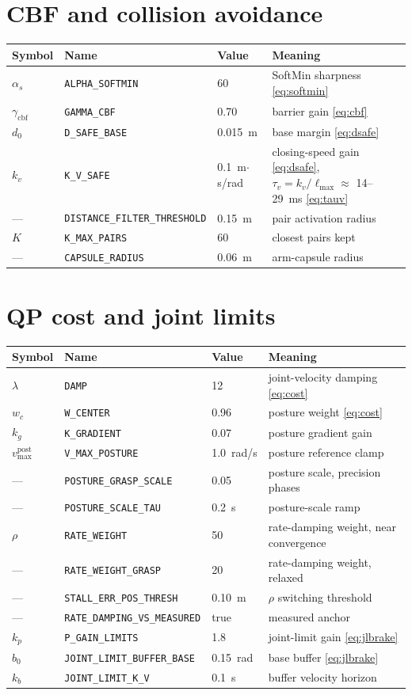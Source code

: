 \documentclass[12pt,a4paper,twoside,openright]{report}
\begin{document}
\section{CBF and collision avoidance}
\begin{tabularx}{\linewidth}{@{}lllX@{}}
\toprule
Symbol & Name & Value & Meaning \\
\midrule
$\alpha_s$ & \texttt{ALPHA\_SOFTMIN} & 60 & SoftMin sharpness \eqref{eq:softmin} \\
$\gamma_{\text{cbf}}$ & \texttt{GAMMA\_CBF} & 0.70 & barrier gain \eqref{eq:cbf} \\
$d_0$ & \texttt{D\_SAFE\_BASE} & 0.015~m & base margin \eqref{eq:dsafe} \\
$k_v$ & \texttt{K\_V\_SAFE} & 0.1~m$\cdot$s/rad & closing-speed gain \eqref{eq:dsafe}, $\tau_v = k_v/\ell_{\max} \approx$ 14--29~ms \eqref{eq:tauv} \\
--- & \texttt{DISTANCE\_FILTER\_THRESHOLD} & 0.15~m & pair activation radius \\
$K$ & \texttt{K\_MAX\_PAIRS} & 60 & closest pairs kept \\
--- & \texttt{CAPSULE\_RADIUS} & 0.06~m & arm-capsule radius \\
\bottomrule
\end{tabularx}

\section{QP cost and joint limits}
\begin{tabularx}{\linewidth}{@{}lllX@{}}
\toprule
Symbol & Name & Value & Meaning \\
\midrule
$\lambda$ & \texttt{DAMP} & 12 & joint-velocity damping \eqref{eq:cost} \\
$w_c$ & \texttt{W\_CENTER} & 0.96 & posture weight \eqref{eq:cost} \\
$k_g$ & \texttt{K\_GRADIENT} & 0.07 & posture gradient gain \\
$v_{\max}^{\text{post}}$ & \texttt{V\_MAX\_POSTURE} & 1.0~rad/s & posture reference clamp \\
--- & \texttt{POSTURE\_GRASP\_SCALE} & 0.05 & posture scale, precision phases \\
--- & \texttt{POSTURE\_SCALE\_TAU} & 0.2~s & posture-scale ramp \\
$\rho$ & \texttt{RATE\_WEIGHT} & 50 & rate-damping weight, near convergence \\
--- & \texttt{RATE\_WEIGHT\_GRASP} & 20 & rate-damping weight, relaxed \\
--- & \texttt{STALL\_ERR\_POS\_THRESH} & 0.10~m & $\rho$ switching threshold \\
--- & \texttt{RATE\_DAMPING\_VS\_MEASURED} & true & measured anchor \\
$k_p$ & \texttt{P\_GAIN\_LIMITS} & 1.8 & joint-limit gain \eqref{eq:jlbrake} \\
$b_0$ & \texttt{JOINT\_LIMIT\_BUFFER\_BASE} & 0.15~rad & base buffer \eqref{eq:jlbrake} \\
$k_b$ & \texttt{JOINT\_LIMIT\_K\_V} & 0.1~s & buffer velocity horizon \\
\bottomrule
\end{tabularx}
\end{document}

